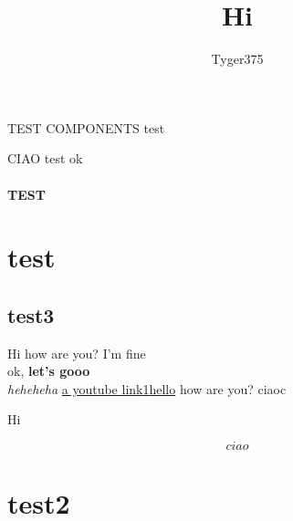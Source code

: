 \documentclass{article}
\title{Hi}
\author{Tyger375}
\date{}
\begin{document}
\maketitle
\tableofcontents
\begin{center}
TEST COMPONENTS
test

\end{center}

CIAO test ok

\paragraph{TEST}\label{hello}

\section{test}\label{sec:hello}

\subsection{test3}\label{sec:test}

Hi how are you? I'm fine\\
ok, \textbf{let's gooo}\\
\textit{heheheha}
\href{https://youtube.com}{a youtube link}\ref{sec:hello}\underline{hello} how are you? ciaoc
\begin{center}
Hi \

\end{center}
$$ciao$$
\section{test2}
\end{document}
